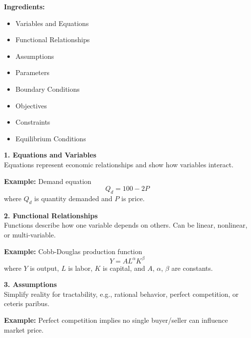 \begin{tcolorbox}[sectionbox]
\textbf{Ingredients:}
\begin{itemize}
    \item Variables and Equations
    \item Functional Relationships
    \item Assumptions
    \item Parameters
    \item Boundary Conditions
    \item Objectives
    \item Constraints
    \item Equilibrium Conditions
\end{itemize}
\end{tcolorbox}



\begin{tcolorbox}[sectionbox]
\textbf{1. Equations and Variables}\\
Equations represent economic relationships and show how variables interact.
\end{tcolorbox}

\begin{tcolorbox}[examplebox]
\textbf{Example:} Demand equation
\[
Q_d = 100 - 2P
\]
where $Q_d$ is quantity demanded and $P$ is price.
\end{tcolorbox}

\begin{tcolorbox}[sectionbox]
\textbf{2. Functional Relationships}\\
Functions describe how one variable depends on others. Can be linear, nonlinear, or multi-variable.
\end{tcolorbox}

\begin{tcolorbox}[examplebox]
\textbf{Example:} Cobb-Douglas production function
\[
Y = A L^\alpha K^\beta
\]
where $Y$ is output, $L$ is labor, $K$ is capital, and $A$, $\alpha$, $\beta$ are constants.
\end{tcolorbox}

\begin{tcolorbox}[sectionbox]
\textbf{3. Assumptions}\\
Simplify reality for tractability, e.g., rational behavior, perfect competition, or ceteris paribus.
\end{tcolorbox}

\begin{tcolorbox}[examplebox]
\textbf{Example:} Perfect competition implies no single buyer/seller can influence market price.
\end{tcolorbox}

